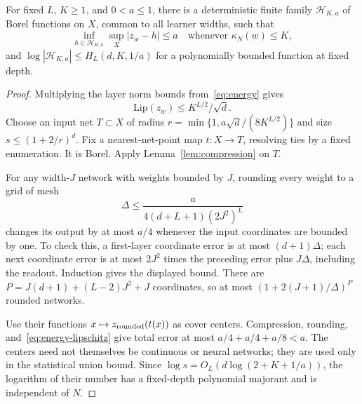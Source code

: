 \documentclass[11pt]{article}
\theoremstyle{remark}\newtheorem{remark}[theorem]{Remark}
\newcommand{\Lip}{\mathrm{Lip}}\newcommand{\KL}{\mathrm{KL}}
\begin{document}
\begin{proposition}\label{prop:energy-cover}
For fixed $L$, $K\geq1$, and $0<a\leq1$, there is a deterministic finite
family $\mathcal H_{K,a}$ of Borel functions on $X$, common to all
learner widths, such that
\[
 \inf_{h\in\mathcal H_{K,a}}\sup_X|z_w-h|\leq a
 \quad\text{whenever }\kappa_N(w)\leq K,
\]
and $\log|\mathcal H_{K,a}|\leq H_L(d,K,1/a)$ for a polynomially
bounded function at fixed depth.
\end{proposition}
\begin{proof}
Multiplying the layer norm bounds from~\eqref{eq:energy} gives
\begin{equation}\label{eq:energy-lipschitz}
 \Lip(z_w)\leq K^{L/2}/\sqrt d.
\end{equation}
Choose an input net $T\subset X$ of radius
$r=\min\{1,a\sqrt d/(8K^{L/2})\}$ and size
$s\leq(1+2/r)^d$. Fix a nearest-net-point map $t:X\to T$, resolving
ties by a fixed enumeration. It is Borel. Apply
Lemma~\ref{lem:compression} on $T$.

For any width-$J$ network with weights bounded by $J$, rounding every
weight to a grid of mesh
\[
 \Delta\leq\frac{a}{4(d+L+1)(2J^2)^L}
\]
changes its output by at most $a/4$ whenever the input coordinates are
bounded by one. To check this, a first-layer coordinate error is at most
$(d+1)\Delta$; each next coordinate error is at most $2J^2$ times
the preceding error plus $J\Delta$, including the readout. Induction
gives the displayed bound.
There are $P=J(d+1)+(L-2)J^2+J$ coordinates, so at most
$(1+2(J+1)/\Delta)^P$ rounded networks.

Use their functions $x\mapsto z_{\rm rounded}(t(x))$ as cover centers.
Compression, rounding, and~\eqref{eq:energy-lipschitz} give total error
at most $a/4+a/4+a/8<a$. The centers need not themselves be continuous
or neural networks; they are used only in the statistical union bound.
Since $\log s=O_L(d\log(2+K+1/a))$, the logarithm of their number has
a fixed-depth polynomial majorant and is independent of $N$.
\end{proof}
\end{document}
